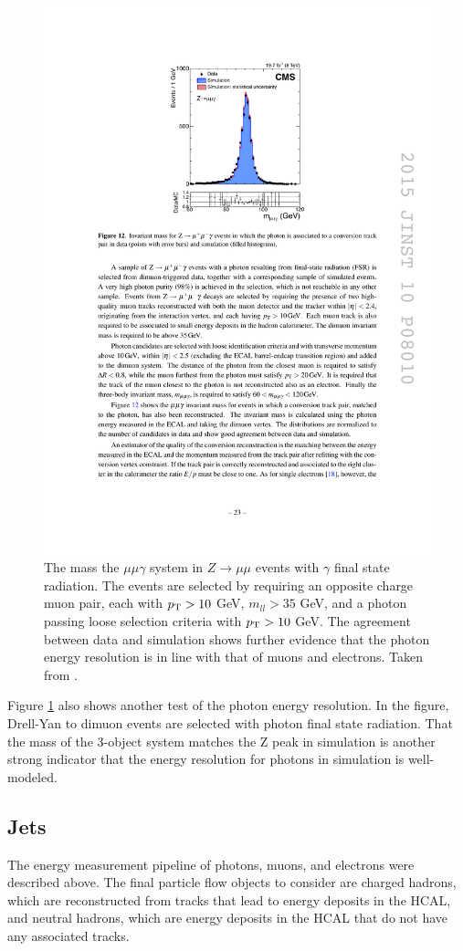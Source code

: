     \begin{figure}[!h]
      \centering
      \includegraphics[width=.5\textwidth]{figures/photon_mumu_Z_peak.pdf}
      \caption{The mass the $\mu \mu \gamma$ system in $Z \to \mu \mu$ events with $\gamma$ final state radiation. The events are selected by requiring an opposite charge muon pair, each with $p_{\mathrm{T}} > 10$ GeV, $m_{ll} > 35$ GeV, and a photon passing loose selection criteria with $p_{\mathrm{T}} > 10$ GeV. The agreement between data and simulation shows further evidence that the photon energy resolution is in line with that of muons and electrons. Taken from \cite[sec. 5]{cms_photons}.}
      \label{fig:photon_mumu_Z_peak}
    \end{figure}

    Figure \ref{fig:photon_mumu_Z_peak} also shows another test of the photon energy resolution. In the figure, Drell-Yan to dimuon events are selected with photon final state radiation. That the mass of the 3-object system matches the Z peak in simulation is another strong indicator that the energy resolution for photons in simulation is well-modeled.

  \FloatBarrier

  \subsection{Jets} \label{sec:jets}
    The energy measurement pipeline of photons, muons, and electrons were described above. The final particle flow objects to consider are charged hadrons, which are reconstructed from tracks that lead to energy deposits in the HCAL, and neutral hadrons, which are energy deposits in the HCAL that do not have any associated tracks.

